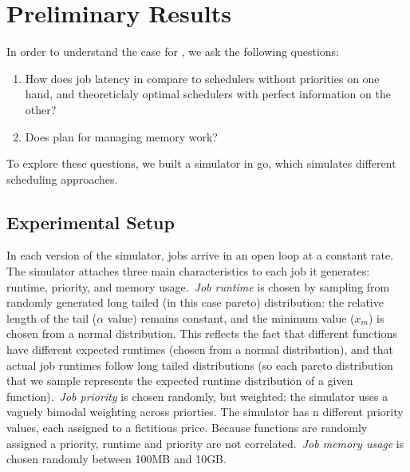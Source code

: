 \section{Preliminary Results}



In order to understand the case for \sys{}, we ask the following questions: 
\begin{enumerate}
    \item How does job latency in \sys{} compare to schedulers without
    priorities on one hand, and theoreticlaly optimal schedulers with perfect
    information on the other?
    \item Does \sys{} plan for managing memory work?
\end{enumerate}


To explore these questions, we built a simulator in go\cite{TODO}, which
simulates different scheduling approaches.


\subsection{Experimental Setup}

In each version of the simulator, jobs arrive in an open loop at a constant
rate. The simulator attaches three main characteristics to each job it
generates: runtime, priority, and memory usage.\ \textit{Job runtime} is chosen
by sampling from randomly generated long tailed (in this case pareto)
distribution: the relative length of the tail ($\alpha$ value) remains constant,
and the minimum value ($x_m$) is chosen from a normal distribution. This
reflects the fact that different functions have different expected runtimes
(chosen from a normal distribution), and that actual job runtimes follow long
tailed distributions (so each pareto distribution that we sample represents the
expected runtime distribution of a given function).\ \textit{Job priority} is
chosen randomly, but weighted: the simulator uses a vaguely bimodal weighting
across priorties. The simulator has n different priority values, each assigned
to a fictitious price. Because functions are randomly assigned a priority,
runtime and priority are not correlated.\ \textit{Job memory usage} is chosen
randomly between 100MB and 10GB.

